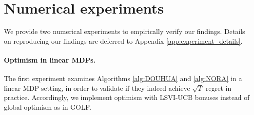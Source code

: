 




\section{Numerical experiments}


We provide two numerical experiments to empirically verify our findings. Details on reproducing our findings are deferred to Appendix \ref{app:experiment_details}.

\paragraph{Optimism in linear MDPs.} The first experiment examines Algorithms \ref{alg:DOUHUA} and \ref{alg:NORA} in a linear MDP setting, in order to validate if they indeed achieve $\sqrt{T}$ regret in practice. Accordingly, we implement optimism with LSVI-UCB bonuses \citep{jin2020provably} instead of global optimism as in GOLF.

